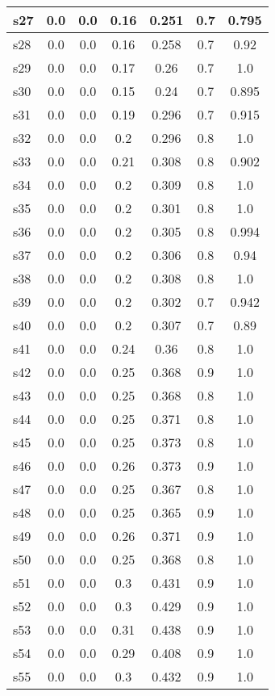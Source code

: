 \documentclass{article}
\begin{document}
\begin{tabular}{|l|c|c|c|c|c|c|}
\hline
s27 &0.0 & 0.0 & 0.16 & 0.251 & 0.7 & 0.795\\
\hline
s28 &0.0 & 0.0 & 0.16 & 0.258 & 0.7 & 0.92\\
\hline
s29 &0.0 & 0.0 & 0.17 & 0.26 & 0.7 & 1.0\\
\hline
s30 &0.0 & 0.0 & 0.15 & 0.24 & 0.7 & 0.895\\
\hline
s31 &0.0 & 0.0 & 0.19 & 0.296 & 0.7 & 0.915\\
\hline
s32 &0.0 & 0.0 & 0.2 & 0.296 & 0.8 & 1.0\\
\hline
s33 &0.0 & 0.0 & 0.21 & 0.308 & 0.8 & 0.902\\
\hline
s34 &0.0 & 0.0 & 0.2 & 0.309 & 0.8 & 1.0\\
\hline
s35 &0.0 & 0.0 & 0.2 & 0.301 & 0.8 & 1.0\\
\hline
s36 &0.0 & 0.0 & 0.2 & 0.305 & 0.8 & 0.994\\
\hline
s37 &0.0 & 0.0 & 0.2 & 0.306 & 0.8 & 0.94\\
\hline
s38 &0.0 & 0.0 & 0.2 & 0.308 & 0.8 & 1.0\\
\hline
s39 &0.0 & 0.0 & 0.2 & 0.302 & 0.7 & 0.942\\
\hline
s40 &0.0 & 0.0 & 0.2 & 0.307 & 0.7 & 0.89\\
\hline
s41 &0.0 & 0.0 & 0.24 & 0.36 & 0.8 & 1.0\\
\hline
s42 &0.0 & 0.0 & 0.25 & 0.368 & 0.9 & 1.0\\
\hline
s43 &0.0 & 0.0 & 0.25 & 0.368 & 0.8 & 1.0\\
\hline
s44 &0.0 & 0.0 & 0.25 & 0.371 & 0.8 & 1.0\\
\hline
s45 &0.0 & 0.0 & 0.25 & 0.373 & 0.8 & 1.0\\
\hline
s46 &0.0 & 0.0 & 0.26 & 0.373 & 0.9 & 1.0\\
\hline
s47 &0.0 & 0.0 & 0.25 & 0.367 & 0.8 & 1.0\\
\hline
s48 &0.0 & 0.0 & 0.25 & 0.365 & 0.9 & 1.0\\
\hline
s49 &0.0 & 0.0 & 0.26 & 0.371 & 0.9 & 1.0\\
\hline
s50 &0.0 & 0.0 & 0.25 & 0.368 & 0.8 & 1.0\\
\hline
s51 &0.0 & 0.0 & 0.3 & 0.431 & 0.9 & 1.0\\
\hline
s52 &0.0 & 0.0 & 0.3 & 0.429 & 0.9 & 1.0\\
\hline
s53 &0.0 & 0.0 & 0.31 & 0.438 & 0.9 & 1.0\\
\hline
s54 &0.0 & 0.0 & 0.29 & 0.408 & 0.9 & 1.0\\
\hline
s55 &0.0 & 0.0 & 0.3 & 0.432 & 0.9 & 1.0\\

\end{tabular}
\end{document}
